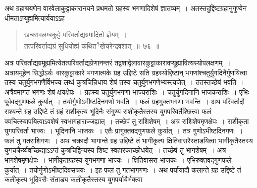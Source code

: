 \documentclass[11pt, openany]{book}
\begin{document}
\indent
अथ ग्रहाश्रयणेन वारवेलाकुट्टाकारानयने प्रथमतो ग्रहस्य भगणादिशेषं
ज्ञातव्यम्~। अतस्तदुद्दिष्टग्रहानुगुण्येन धीमताऽप्यूह्यमित्यार्ययाऽऽह\textendash
\begin{quote}
{\ks खचरावलम्बकुट्टे परिवर्ताद्यग्रमादितो ज्ञेयम्~।\\
तत्परिवर्ताद्यग्रं सुधियोह्यं कथित\textsuperscript{१}खेचरेन्द्रवशात्~॥~७६~॥}
\end{quote}
\indent
अत्र परिवर्ताद्यग्रमूह्यमित्येतत्परिवर्ताद्यग्रेणानन्तरं तद्वशाद्वेलावारकुट्टाकारावप्यूह्यावित्यस्योपलक्षणम्~। अत्रायमूहेन सिद्धोऽर्थः\textendash\ वारकुट्टाकारे भगणात्मके ग्रह उद्दिष्टे सति ग्रहस्योद्दिष्टान्
भगणांश्चतुर्युगदिनैर्गुणयित्वा तस्य चतुर्युगभगणैर्विभज्य लब्धं कुत्रचिन्निधाय शेषं तस्य
चतुर्युगभगणेभ्यस्त्यजेत्~। ततस्तच्छेषं भवति~। अत्रैवमागतं भगणः शेषं क्षयक्षेपः~। ग्रहस्य
चतुर्युगभगणा भाज्यराशिः~। चतुर्युगदिनानि भाजकराशिः~। एभिः पूर्ववद्गुणफले कुर्यात्~। तयोर्गुणोऽभीष्टदिनगणो भवति~। फलं ग्रहभुक्तभगणा भवन्ति~। अथ परिवर्तादौ राश्यन्ते ग्रह उद्दिष्टे तं ग्रहं राशीकृत्य भूदिनैः संगुण्य राशीकृतैस्तस्य युगपरिवर्तैश्छित्त्वा फलं क्वचित्स्यापयित्वाऽवशेषं स्वभागहाराज्जह्यात्~। तच्छेपं तु राशिशेषम्~। अत्र राशिशेषमृणक्षेपः~। राशीकृता युगपरिवर्ता भाज्यः~। भूदिनानि भाजकः~। एतैः प्रागुक्तवद्गुणफले कुर्यात्~। तत्र गुणोऽभीष्टदिनगणः~। फलं तु गतराशिगणः~। अथ चक्रादौ भागान्ते ग्रह उद्दिष्टे तं भागीकृत्य क्षितिवासरैस्ताडयित्वा भागीकृतैस्तस्य युगचक्रैर्व्यवच्छिद्याऽऽप्तं कुत्रचिद्विन्यस्य शिष्ट स्वहारकाच्छोधयेत्~। तच्छेषं तु भागशेषम्~। अत्र भागशेषमृणक्षेपः~। भागीकृतग्रहस्य युगभगणा भाज्यः~। क्षितिवासरा भाजकः~। एभिरुक्तवद्गुणफले कुर्यात्~। तयोर्गुणोऽभीष्टदिवसचयः~। इह फलं तु गतभागगणः~। अथ पर्यायादौ कलान्ते ग्रह उद्दिष्टे तं कलीकृत्य भूदिवसैः संताड्य कलीकृतैस्तस्य युगपर्यायैर्भक्त्वा

\end{document}
